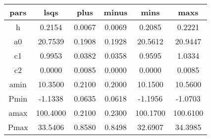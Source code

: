 \begin{table}
\begin{tabular}{cccccc}
\hline \hline
pars & lsqs & plus & minus & mins & maxs \\
\hline
h & 0.2154 & 0.0067 & 0.0069 & 0.2085 & 0.2221 \\
a0 & 20.7539 & 0.1908 & 0.1928 & 20.5612 & 20.9447 \\
c1 & 0.9953 & 0.0382 & 0.0358 & 0.9595 & 1.0334 \\
c2 & 0.0000 & 0.0085 & 0.0000 & 0.0000 & 0.0085 \\
amin & 10.3500 & 0.2100 & 0.2000 & 10.1500 & 10.5600 \\
Pmin & -1.1338 & 0.0635 & 0.0618 & -1.1956 & -1.0703 \\
amax & 100.4000 & 0.2100 & 0.2300 & 100.1700 & 100.6100 \\
Pmax & 33.5406 & 0.8580 & 0.8498 & 32.6907 & 34.3985 \\
\hline
\end{tabular}
\end{table}
